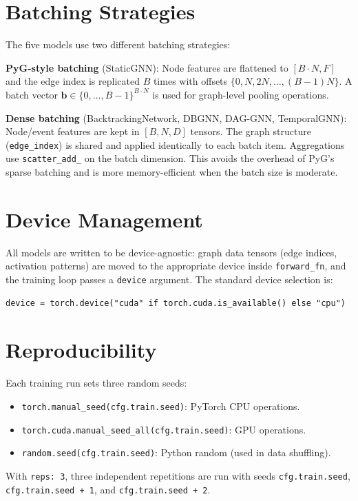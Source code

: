 \documentclass[12pt,a4paper]{report}
\begin{document}
\section{Batching Strategies}

The five models use two different batching strategies:

\textbf{PyG-style batching} (StaticGNN): Node features are flattened to
$[B \cdot N, F]$ and the edge index is replicated $B$ times with offsets $\{0,
N, 2N, \ldots, (B-1)N\}$. A batch vector $\mathbf{b} \in \{0,\ldots,B-1\}^{B \cdot N}$
is used for graph-level pooling operations.

\textbf{Dense batching} (BacktrackingNetwork, DBGNN, DAG-GNN, TemporalGNN):
Node/event features are kept in $[B, N, D]$ tensors. The graph structure
(\texttt{edge\_index}) is shared and applied identically to each batch item.
Aggregations use \texttt{scatter\_add\_} on the batch dimension. This avoids
the overhead of PyG's sparse batching and is more memory-efficient when the
batch size is moderate.

\section{Device Management}

All models are written to be device-agnostic: graph data tensors (edge indices,
activation patterns) are moved to the appropriate device inside \texttt{forward\_fn},
and the training loop passes a \texttt{device} argument. The standard device
selection is:
\begin{lstlisting}
device = torch.device("cuda" if torch.cuda.is_available() else "cpu")
\end{lstlisting}

\section{Reproducibility}

Each training run sets three random seeds:
\begin{itemize}[noitemsep]
  \item \texttt{torch.manual\_seed(cfg.train.seed)}: PyTorch CPU operations.
  \item \texttt{torch.cuda.manual\_seed\_all(cfg.train.seed)}: GPU operations.
  \item \texttt{random.seed(cfg.train.seed)}: Python random (used in data shuffling).
\end{itemize}
With \texttt{reps: 3}, three independent repetitions are run with seeds
\texttt{cfg.train.seed}, \texttt{cfg.train.seed + 1}, and
\texttt{cfg.train.seed + 2}.
\end{document}
